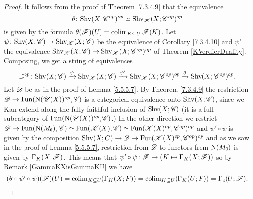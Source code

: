 \documentclass[../../thesis.tex]{subfiles}
\begin{document}
\begin{proof}
    It follows from the proof of Theorem \ref{7.3.4.9} that the equivalence
    \[
        \theta\colon \mathrm{Shv}(X;\mathscr{C}^{op})^{op} \simeq \mathrm{Shv}_{\mathscr{K}}(X;\mathscr{C}^{op})^{op}
    \]
    is given by the formula $\theta(\mathscr{F})(U) = \operatorname{colim}_{K\subseteq U}\mathscr{F}(K)$.
    Let $\psi\colon \mathrm{Shv}(X;\mathscr{C}) \to \mathrm{Shv}_{\mathscr{K}}(X;\mathscr{C})$ be the equivalence of Corollary \ref{7.3.4.10} and $\psi'$ the equivalence $\mathrm{Shv}_{\mathscr{K}}(X;\mathscr{C}) \to \mathrm{Shv}_{\mathscr{K}}(X;\mathscr{C}^{op})^{op}$ of Theorem \ref{KVerdierDuality}.
    Composing, we get a string of equivalences
    \[
        \mathbb{D}^{op} \colon \mathrm{Shv}(X;\mathscr{C}) \xrightarrow{\psi} \mathrm{Shv}_{\mathscr{K}}(X;\mathscr{C}) \xrightarrow{\psi'} \mathrm{Shv}_{\mathscr{K}}(X;\mathscr{C}^{op})^{op} \xrightarrow{\theta} \mathrm{Shv}(X;\mathscr{C}^{op})^{op}.
    \]
    Let $\mathscr{D}$ be as in the proof of Lemma \ref{5.5.5.7}.
    By Theorem \ref{7.3.4.9} the restriction $\mathscr{D}\to \mathrm{Fun}(\mathrm{N}(\mathscr{U}(X))^{op}, \mathscr{C})$ is a categorical equivalence onto $\mathrm{Shv}(X;\mathscr{C})$, since we Kan extend along the fully faithful inclusion of $\mathrm{Shv}(X;\mathscr{C})$ (it is a full subcategory of $\mathrm{Fun}(\mathrm{N}(\mathscr{U}(X))^{op}, \mathscr{C})$.)
    \newline
    In the other direction we restrict $\mathscr{D} \to \mathrm{Fun}(\mathrm{N}(M_0), \mathscr{C}) \simeq \mathrm{Fun}(\mathscr{K}(X), \mathscr{C}) \simeq \mathrm{Fun}(\mathscr{K}(X)^{op}, \mathscr{C}^{op})^{op}$ and $\psi' \circ \psi$ is given by the composition $\mathrm{Shv}(X;C) \to \mathscr{D} \to \mathrm{Fun}(\mathscr{K}(X)^{op}, \mathscr{C}^{op})^{op}$ and as we saw in the proof of Lemma \ref{5.5.5.7}, restriction from $\mathscr{D}$ to functors from $\mathrm{N}(M_0)$ is given by $\Gamma_K(X;\mathscr{F})$.
    This means that $\psi' \circ \psi \colon \mathscr{F} \mapsto \left( K \mapsto \Gamma_K(X;\mathscr{F}) \right)$ so by Remark \ref{GammaKXisGammaKU} we have
    \[
        (\theta \circ \psi' \circ \psi)(\mathscr{F})(U) = \operatorname{colim}_{K\subseteq U}(\Gamma_K(X;F)) = \operatorname{colim}_{K\subseteq U}(\Gamma_K(U;F)) = \Gamma_c(U;\mathscr{F}).
    \]
\end{proof}
\end{document}
